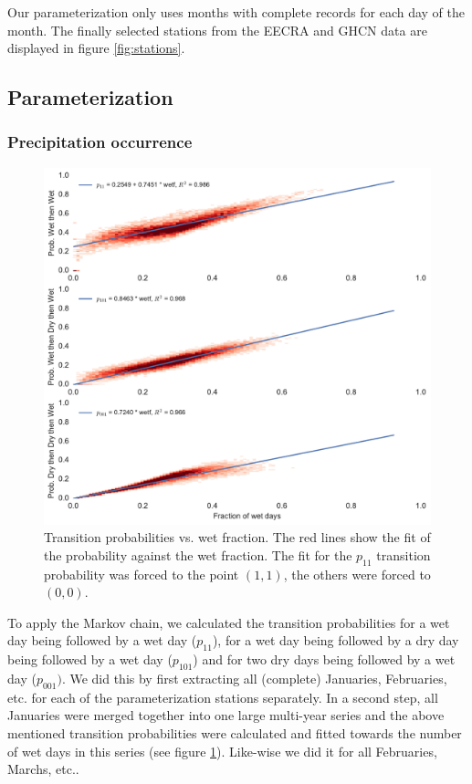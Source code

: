 \begin{refsection}
Our parameterization only uses months with complete records for each day of the month. The finally selected stations from the EECRA and GHCN data are displayed in figure \ref{fig:stations}.

\subsection{Parameterization} \label{sec:param}

\subsubsection{Precipitation occurrence} \label{sec:markov}

\begin{figure}
	\includegraphics[width=12cm]{figures/markov.pdf}
	\caption[Transition probabilities vs. wet fraction]{Transition probabilities vs. wet fraction. The red lines show the fit of the probability against the wet fraction. The fit for the $p_{11}$ transition probability was forced to the point $(1, 1)$, the others were forced to $(0, 0)$.}
	\label{fig:markov}
\end{figure}

To apply the Markov chain, we calculated the transition probabilities for a wet day being followed by a wet day ($p_{11}$), for a wet day being followed by a dry day being followed by a wet day ($p_{101}$) and for two dry days being followed by a wet day ($p_{001})$.  We did this by first extracting all (complete) Januaries, Februaries, etc. for each of the parameterization stations separately. In a second step, all Januaries were merged together into one large multi-year series and the above mentioned transition probabilities were calculated and fitted towards the number of wet days in this series (see figure \ref{fig:markov}). Like-wise we did it for all Februaries, Marchs, etc..


\end{refsection}

